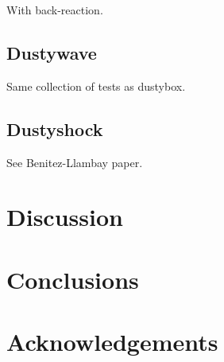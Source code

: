 \documentclass[fleqn,usenatbib]{mnras}
\begin{document}
With back-reaction.

\subsection{Dustywave}

Same collection of tests as dustybox.

\subsection{Dustyshock}
See Benitez-Llambay paper.

\section{Discussion}

\section{Conclusions}

\section*{Acknowledgements}
















\bsp %
\label{lastpage}
\end{document}
